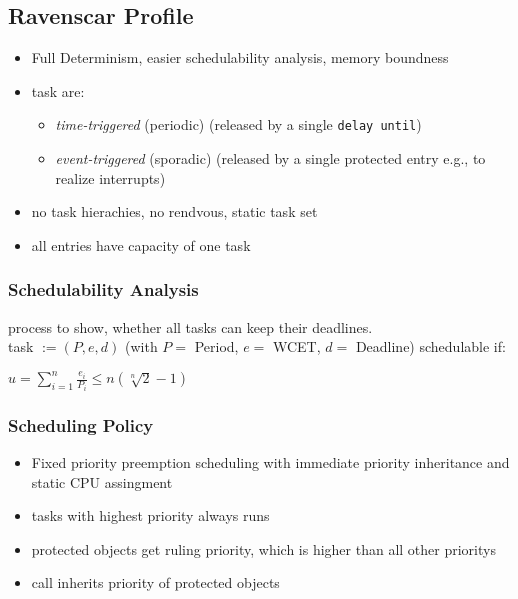 \documentclass[german]{latex4ei/latex4ei_sheet}
\begin{document}
\begin{sectionbox}
\subsection{Ravenscar Profile}
\begin{itemize}
\item Full Determinism, easier schedulability analysis, memory boundness
\item task are:
\begin{itemize}
\item \textit{time-triggered} (periodic) (released by a single \texttt{delay until})
\item \textit{event-triggered} (sporadic) (released by a single protected entry e.g., to realize interrupts)
\end{itemize}
\item no task hierachies, no rendvous, static task set
\item all entries have capacity of one task
\end{itemize}

\subsubsection{Schedulability Analysis}
process to show, whether all tasks can keep their deadlines.\\
task $:= (P,e,d)$ (with $P = $ Period, $e = $ WCET, $d = $ Deadline) schedulable if:

\begin{emphbox}
	$u = \sum\limits_{i = 1}^{n} \frac{e_i}{P_i} \le n \left(\sqrt[n]{2} - 1 \right)$
\end{emphbox}

\subsubsection{Scheduling Policy}
\begin{itemize}
\item Fixed priority preemption scheduling with immediate priority inheritance and static CPU assingment
\item tasks with highest priority always runs
\item protected objects get ruling priority, which is higher than all other prioritys
\item call inherits priority of protected objects
\end{itemize}
\end{sectionbox}
\end{document}
